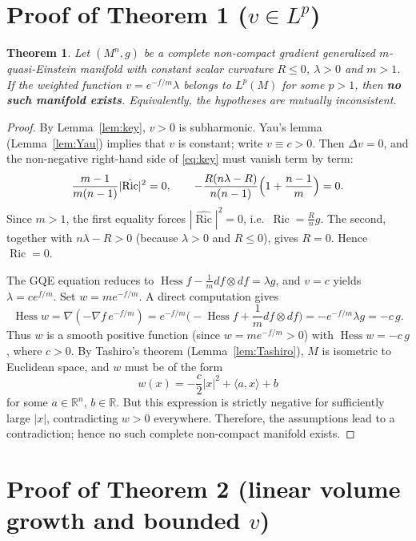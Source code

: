 \documentclass[12pt,a4paper]{article}
\newcommand{\Ric}{\operatorname{Ric}}
\newcommand{\Hess}{\operatorname{Hess}}
\newtheorem{theorem}{Theorem}[section]
\theoremstyle{definition}
\theoremstyle{definition}
\begin{document}
\section{Proof of Theorem 1 ($v\in L^p$)}
\label{sec:thm1}

\begin{theorem}\label{thm1}
Let $(M^n,g)$ be a complete non-compact gradient generalized $m$-quasi-Einstein manifold with constant scalar curvature $R\le 0$, $\lambda>0$ and $m>1$.
If the weighted function $v=e^{-f/m}\lambda$ belongs to $L^p(M)$ for some $p>1$, then \textbf{no such manifold exists}. Equivalently, the hypotheses are mutually inconsistent.
\end{theorem}

\begin{proof}
By Lemma~\ref{lem:key}, $v>0$ is subharmonic.
Yau's lemma (Lemma~\ref{lem:Yau}) implies that $v$ is constant; write $v\equiv c>0$.
Then $\Delta v=0$, and the non-negative right-hand side of \eqref{eq:key} must vanish term by term:
\begin{gather*}
\frac{m-1}{m(n-1)}|\hat{\Ric}|^2 = 0,\qquad
-\frac{R(n\lambda-R)}{n(n-1)}\Bigl(1+\frac{n-1}{m}\Bigr) = 0.
\end{gather*}
Since $m>1$, the first equality forces $|\hat{\Ric}|^2=0$, i.e.\ $\Ric = \frac{R}{n}g$.
The second, together with $n\lambda-R>0$ (because $\lambda>0$ and $R\le 0$), gives $R=0$.
Hence $\Ric = 0$.

The GQE equation reduces to $\Hess f - \frac1m df\otimes df = \lambda g$, and $v=c$ yields $\lambda = c e^{f/m}$.
Set $w = m e^{-f/m}$.
A direct computation gives
\[
\Hess w = \nabla( -\nabla f\, e^{-f/m}) = e^{-f/m}\bigl( -\Hess f + \frac1m df\otimes df \bigr)
= -e^{-f/m}\lambda g = -c\,g.
\]
Thus $w$ is a smooth positive function (since $w = m e^{-f/m} > 0$) with $\Hess w = -c\,g$, where $c>0$.
By Tashiro's theorem (Lemma~\ref{lem:Tashiro}), $M$ is isometric to Euclidean space, and $w$ must be of the form
\[
w(x) = -\frac{c}{2}|x|^2 + \langle a, x\rangle + b
\]
for some $a\in\mathbb{R}^n$, $b\in\mathbb{R}$.
But this expression is strictly negative for sufficiently large $|x|$, contradicting $w>0$ everywhere.
Therefore, the assumptions lead to a contradiction; hence no such complete non-compact manifold exists.
\end{proof}

\section{Proof of Theorem 2 (linear volume growth and bounded $v$)}
\label{sec:thm2}
\end{document}
